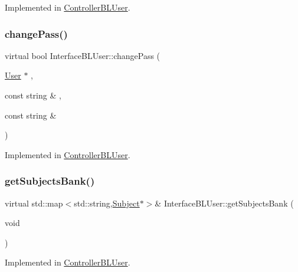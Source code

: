Implemented in \hyperlink{class_controller_b_l_user_a8fb74fe44753778c8bf820f51737dd76}{Controller\+B\+L\+User}.

\mbox{\label{class_interface_b_l_user_a1d683de35fc2d6e65379add3f0a42b61}} 
\subsubsection{\texorpdfstring{change\+Pass()}{changePass()}}
{\footnotesize\ttfamily virtual bool Interface\+B\+L\+User\+::change\+Pass (\begin{DoxyParamCaption}\item[{\hyperlink{class_user}{User} $\ast$}]{,  }\item[{const string \&}]{,  }\item[{const string \&}]{ }\end{DoxyParamCaption})\hspace{0.3cm}{\ttfamily [pure virtual]}}



Implemented in \hyperlink{class_controller_b_l_user_a90ac2cdd863f28b57b6e7d27ff4ede0c}{Controller\+B\+L\+User}.

\mbox{\label{class_interface_b_l_user_a36499250fd10ab2875bbdeb6a0dd4030}} 
\subsubsection{\texorpdfstring{get\+Subjects\+Bank()}{getSubjectsBank()}}
{\footnotesize\ttfamily virtual std\+::map$<$std\+::string,\hyperlink{class_subject}{Subject}$\ast$$>$\& Interface\+B\+L\+User\+::get\+Subjects\+Bank (\begin{DoxyParamCaption}\item[{void}]{ }\end{DoxyParamCaption})\hspace{0.3cm}{\ttfamily [pure virtual]}}



Implemented in \hyperlink{class_controller_b_l_user_a2f422b6fdb912d9bec90af7de56e7656}{Controller\+B\+L\+User}.


